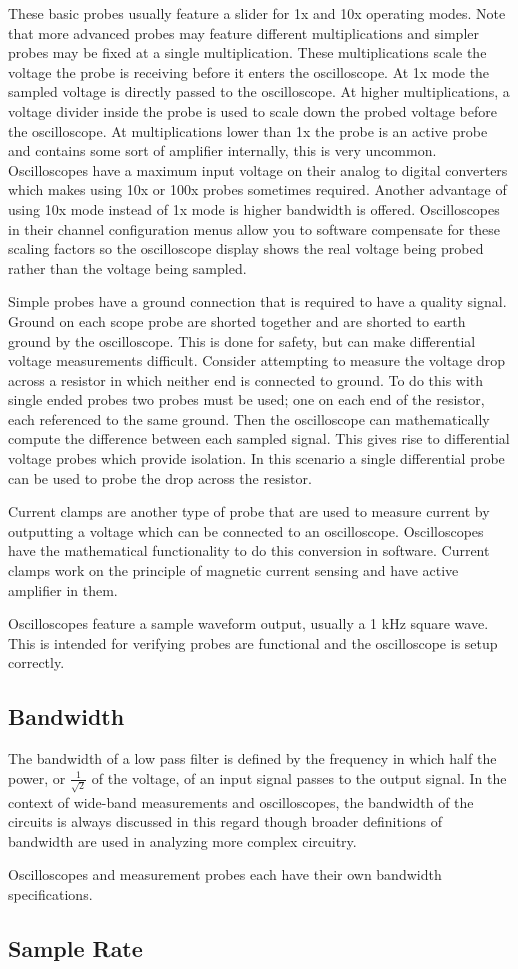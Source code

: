 \documentclass[main.tex]{subfiles}
\begin{document}
These basic probes usually feature a slider for 1x and 10x operating modes. Note that more advanced probes may feature different multiplications and simpler probes may be fixed at a single multiplication. These multiplications scale the voltage the probe is receiving before it enters the oscilloscope. At 1x mode the sampled voltage is directly passed to the oscilloscope. At higher multiplications, a voltage divider inside the probe is used to scale down the probed voltage before the oscilloscope. At multiplications lower than 1x the probe is an active probe and contains some sort of amplifier internally, this is very uncommon. Oscilloscopes have a maximum input voltage on their analog to digital converters which makes using 10x or 100x probes sometimes required. Another advantage of using 10x mode instead of 1x mode is higher bandwidth is offered. Oscilloscopes in their channel configuration menus allow you to software compensate for these scaling factors so the oscilloscope display shows the real voltage being probed rather than the voltage being sampled.

Simple probes have a ground connection that is required to have a quality signal. Ground on each scope probe are shorted together and  are shorted to earth ground by the oscilloscope. This is done for safety, but can make differential voltage measurements difficult. Consider attempting to measure the voltage drop across a resistor in which neither end is connected to ground. To do this with single ended probes two probes must be used; one on each end of the resistor, each referenced to the same ground. Then the oscilloscope can mathematically compute the difference between each sampled signal. This gives rise to differential voltage probes which provide isolation. In this scenario a single differential probe can be used to probe the drop across the resistor.

Current clamps are another type of probe that are used to measure current by outputting a voltage which can be connected to an oscilloscope. Oscilloscopes have the mathematical functionality to do this conversion in software. Current clamps work on the principle of magnetic current sensing and have active amplifier in them.

Oscilloscopes feature a sample waveform output, usually a 1 kHz square wave. This is intended for verifying probes are functional and the oscilloscope is setup correctly.

\subsection{Bandwidth}
The bandwidth of a low pass filter is defined by the frequency in which half the power, or $\frac{1}{\sqrt{2}}$ of the voltage, of an input signal passes to the output signal. In the context of wide-band measurements and oscilloscopes, the bandwidth of the circuits is always discussed in this regard though broader definitions of bandwidth are used in analyzing more complex circuitry.

Oscilloscopes and measurement probes each have their own bandwidth specifications. 

\subsection{Sample Rate}

\end{document}
